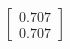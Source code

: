 \documentclass[preview]{standalone}
\begin{document}
\begin{align*}
\begin{bmatrix} 0.707 \\ 0.707 \end{bmatrix}
\end{align*}
\end{document}
